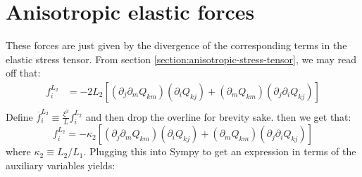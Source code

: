 \documentclass[reqno]{article}
\begin{document}
\section{Anisotropic elastic forces}
These forces are just given by the divergence of the corresponding terms in the elastic stress tensor.
From section \ref{section:anisotropic-stress-tensor}, we may read off that:
\begin{equation}
\begin{split}
	f^{L_2}_i
	&= - 2 L_2 \left[
	\left( \partial_j \partial_m Q_{km} \right)
	\left( \partial_i Q_{kj} \right)
	+ \left( \partial_m Q_{km} \right)
	\left( \partial_j \partial_i Q_{kj} \right)
	\right] \\
\end{split}
\end{equation}
Define $\overline{f}^{L_2}_i \equiv \frac{\xi^3}{L} f^{L_2}_i$ and then drop the overline for brevity sake.
then we get that:
\begin{equation}
	f^{L_2}_i
	= -\kappa_2 \left[
	\left( \partial_j \partial_m Q_{km} \right)
	\left( \partial_i Q_{kj} \right)
	+ \left( \partial_m Q_{km} \right)
	\left( \partial_j \partial_i Q_{kj} \right)
	\right]
\end{equation}
where $\kappa_2 \equiv L_2/L_1$. 
Plugging this into Sympy to get an expression in terms of the auxiliary variables yields:
\end{document}
